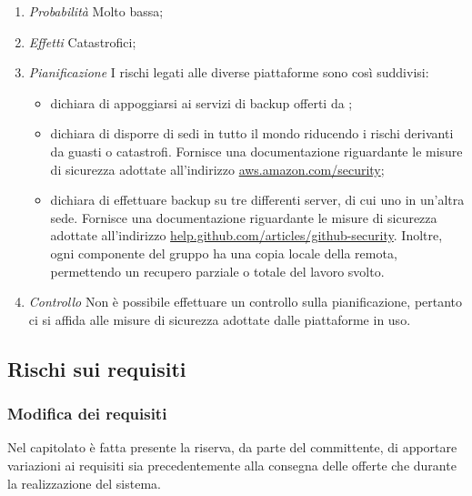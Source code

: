 \begin{enumerate}
\item \textit{Probabilità} Molto bassa;
\item \textit{Effetti} Catastrofici;
\item \textit{Pianificazione} I rischi legati alle diverse piattaforme sono così suddivisi:

	\begin{itemize}
	\item {} dichiara di appoggiarsi ai servizi di backup offerti da ;
	\item {} dichiara di disporre di sedi in tutto il mondo riducendo i rischi derivanti da guasti o catastrofi. Fornisce una documentazione riguardante le misure di sicurezza adottate all'indirizzo \url{aws.amazon.com/security};
	\item {} dichiara di effettuare backup su tre differenti server,  di cui uno in un'altra sede. Fornisce una documentazione riguardante le misure di sicurezza adottate all'indirizzo \url{help.github.com/articles/github-security}. Inoltre, ogni componente del gruppo ha una copia locale della  remota, permettendo un recupero parziale o totale del lavoro svolto. 
	\end{itemize}
	
\item \textit{Controllo} Non è possibile effettuare un controllo sulla pianificazione, pertanto ci si affida alle misure di sicurezza adottate dalle piattaforme in uso.
\end{enumerate}
	
	\subsection{Rischi sui requisiti}
	
		\subsubsection{Modifica dei requisiti}
		
Nel capitolato è fatta presente la riserva, da parte del committente, di apportare variazioni ai requisiti sia precedentemente alla consegna delle offerte che durante la realizzazione del sistema.

